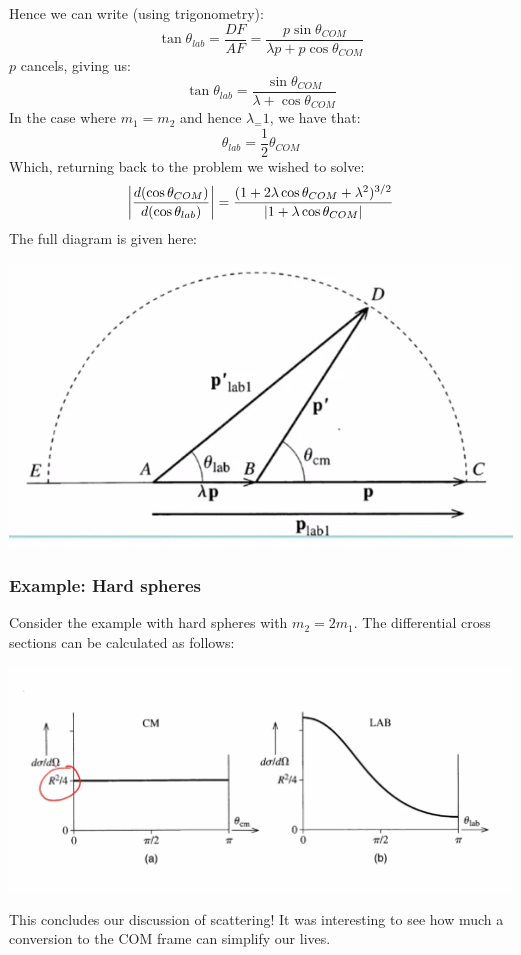 Hence we can write (using trigonometry):
\[\tan\theta_{lab} = \frac{DF}{AF} = \frac{p\sin\theta_{COM}}{\lambda p + p\cos\theta_{COM}}\]
$p$ cancels, giving us:
\[\tan\theta_{lab} = \frac{\sin\theta_{COM}}{\lambda + \cos\theta_{COM}}\]
In the case where $m_1 = m_2$ and hence $\lambda_ = 1$, we have that:
\[\theta_{lab} = \frac{1}{2}\theta_{COM}\]
Which, returning back to the problem we wished to solve:
\[\abs{\frac{d(\cos\theta_{COM})}{d(\cos\theta_{lab})}} = \frac{(1 + 2\lambda\cos\theta_{COM} + \lambda^2)^{3/2}}{\abs{1 + \lambda \cos \theta_{COM}}} \]
The full diagram is given here:
\begin{center}
    \includegraphics[scale=0.5]{Lecture-29/l29-img6.png}
\end{center}
\subsubsection{Example: Hard spheres}
Consider the example with hard spheres with $m_2 = 2m_1$. The differential cross sections can be calculated as follows:
\begin{center}
    \includegraphics[scale=0.5]{Lecture-29/l29-img7.png}
\end{center}
This concludes our discussion of scattering! It was interesting to see how much a conversion to the COM frame can simplify our lives. 


